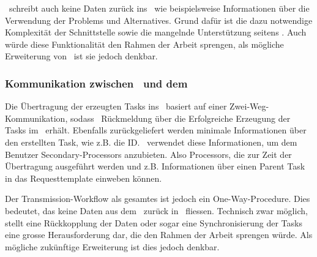 				\eeppi\ schreibt auch keine Daten zurück ins \dks\ wie beispielsweise Informationen über die Verwendung der Problems und Alternatives.
				Grund dafür ist die dazu notwendige Komplexität der Schnittstelle sowie die mangelnde Unterstützung seitens \dks.
				Auch würde diese Funktionalität den Rahmen der Arbeit sprengen, als mögliche Erweiterung von \eeppi\ ist sie jedoch denkbar.
				
			
			\subsubsection{Kommunikation zwischen \eeppi\ und dem \ppt}
				Die Übertragung der erzeugten Tasks ins \ppt\ basiert auf einer Zwei-Weg-Kommunikation, 
				sodass \eeppi\ Rückmeldung über die Erfolgreiche Erzeugung der Tasks im \ppt\ erhält. Ebenfalls zurückgeliefert werden minimale Informationen über den erstellten Task, 
				wie z.B. die ID. 
				\eeppi\ verwendet diese Informationen, um dem Benutzer Secondary-Processors anzubieten.
				Also Processors, die zur Zeit der Übertragung ausgeführt werden und z.B. Informationen über einen Parent Task in das Requesttemplate einweben können.
				
				Der Transmission-Workflow als gesamtes ist jedoch ein One-Way-Procedure.
				Dies bedeutet, das keine Daten aus dem \ppt\ zurück in \eeppi\ fliessen.
				Technisch zwar möglich, stellt eine Rückkopplung der Daten oder sogar eine Synchronisierung der Tasks eine grosse Herausforderung dar, 
				die den Rahmen der Arbeit sprengen würde.
				Als mögliche zukünftige Erweiterung ist dies jedoch denkbar.